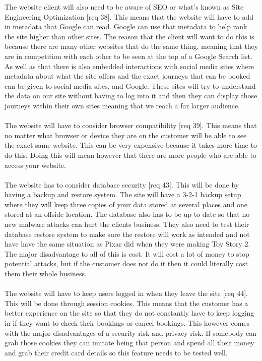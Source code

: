 \documentclass{article}
\begin{document}
The website client will also need to be aware of SEO or what's known as Site Engineering Optimization [req 38]. This means that the website will have to add in metadata that Google can read. Google can use that metadata to help rank the site higher than other sites. The reason that the client will want to do this is because there are many other websites that do the same thing, meaning that they are in competition with each other to be seen at the top of a Google Search list. As well as that there is also embedded interactions with social media sites where metadata about what the site offers and the exact journeys that can be booked can be given to social media sites, and Google. These sites will try to understand the data on our site without having to log into it and then they can display those journeys within their own sites meaning that we reach a far larger audience.
\\
\\

The website will have to consider browser compatibility [req 39]. This means that no matter what browser or device they are on the customer will be able to see the exact same website. This can be very expensive because it takes more time to do this. Doing this will mean however that there are more people who are able to access your website.
\\
\\

The website has to consider database security [req 43]. This will be done by having a backup and restore system. The site will have a 3-2-1 backup setup where they will keep three copies of your data stored at several places and one stored at an offside location. The database also has to be up to date so that no new malware attacks can hurt the clients business. They also need to test their database restore system to make sure the restore will work as intended and not have have the same situation as Pixar did when they were making Toy Story 2. The major disadvantage to all of this is cost. It will cost a lot of money to stop potential attacks, but if the customer does not do it then it could literally cost them their whole business.
\\
\\

The website will have to keep users logged in when they leave the site [req 44]. This will be done through session cookies. This means that the customer has a better experience on the site so that they do not constantly have to keep logging in if they want to check their bookings or cancel bookings. This however comes with the major disadvantages of a security risk and privacy risk. If somebody can grab those cookies they can imitate being that person and spend all their money and grab their credit card details so this feature needs to be tested well.
\\
\\
\end{document}
